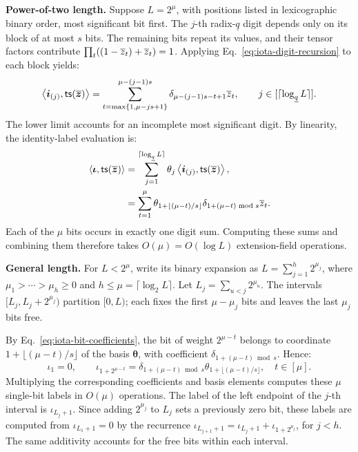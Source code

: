 \smallskip\noindent\textbf{Power-of-two length.}
Suppose \(L=2^\mu\), with positions listed in lexicographic
binary order, most significant bit first.
The \(j\)-th radix-\(\underline q\) digit depends only on
its block of at most \(s\) bits.
The remaining bits repeat its values, and their tensor
factors contribute \(\prod_t((1-\overline{z}_t)+\overline{z}_t)=1\).
Applying Eq.~\eqref{eq:iota-digit-recursion} to each block yields:
\begin{equation}
    \left\langle\bm i_{(j)},{\sf ts}(\overline{\bm z})\right\rangle
       =
       \sum_{t=\max\{1,\mu-js+1\}}^{\mu-(j-1)s}
          \delta_{\mu-(j-1)s-t+1}\overline{z}_t,
    \qquad
    j\in[\lceil\log_{\underline q}L\rceil].
\label{eq:iota-bit-coefficients}
\end{equation}
The lower limit accounts for an incomplete most significant
digit. By linearity, the identity-label evaluation is:
\begin{align*}
    \left\langle\bm\iota,{\sf ts}(\overline{\bm z})\right\rangle
       &=
       \sum_{j=1}^{\lceil\log_{\underline q}L\rceil}
          \theta_j
          \left\langle\bm i_{(j)},{\sf ts}(\overline{\bm z})\right\rangle,
       \\
       &=\sum_{t=1}^{\mu}
          \theta_{1+\lfloor(\mu-t)/s\rfloor}
          \delta_{1+(\mu-t)\bmod s}\overline{z}_t.
\end{align*}
Each of the \(\mu\) bits occurs in exactly one digit sum.
Computing these sums and combining them therefore takes
\(O(\mu)=O(\log L)\) extension-field operations.

\smallskip\noindent\textbf{General length.}
For \(L<2^\mu\), write its binary expansion as
\(L=\sum_{j=1}^h2^{\mu_j}\), where
\(\mu_1>\cdots>\mu_h\geq0\) and
\(h\leq\mu=\lceil\log_2L\rceil\).
Let \(L_j=\sum_{u<j}2^{\mu_u}\).
The intervals \([L_j,L_j+2^{\mu_j})\) partition \([0,L)\);
each fixes the first \(\mu-\mu_j\) bits and leaves the
last \(\mu_j\) bits free.

By Eq.~\eqref{eq:iota-bit-coefficients}, the bit of weight
\(2^{\mu-t}\) belongs to coordinate
\(1+\lfloor(\mu-t)/s\rfloor\) of the basis \(\bm\theta\),
with coefficient \(\delta_{1+(\mu-t)\bmod s}\). Hence:
\[
    \iota_1=0,
    \qquad
    \iota_{1+2^{\mu-t}}
       =\delta_{1+(\mu-t)\bmod s}
          \theta_{1+\lfloor(\mu-t)/s\rfloor},
    \quad t\in[\mu].
\]
Multiplying the corresponding coefficients and basis elements
computes these \(\mu\) single-bit labels in \(O(\mu)\) operations.
The label of the left endpoint of the \(j\)-th interval is
\(\iota_{L_j+1}\).
Since adding \(2^{\mu_j}\) to \(L_j\) sets a previously zero
bit, these labels are computed from \(\iota_{L_1+1}=0\)
by the recurrence
\(\iota_{L_{j+1}+1}=\iota_{L_j+1}+\iota_{1+2^{\mu_j}}\),
for \(j<h\).
The same additivity accounts for the free bits within
each interval.

